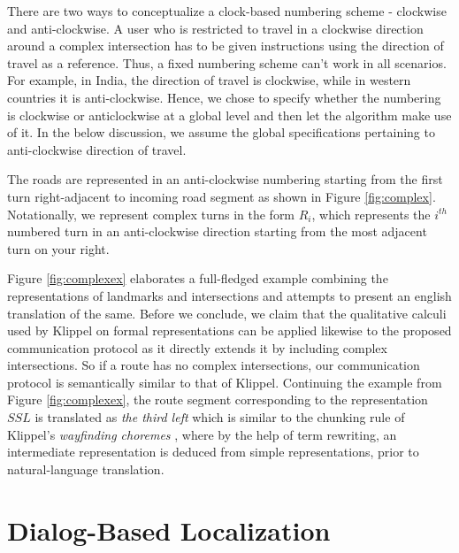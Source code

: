 \documentclass{iitkthesis}
\begin{document}
There are two ways to conceptualize a clock-based numbering scheme - clockwise and anti-clockwise. A user who is restricted to travel in a clockwise direction around a complex intersection has to be given instructions using the direction of travel as a reference. Thus, a fixed numbering scheme can't work in all scenarios. For example, in India, the direction of travel is clockwise, while in western countries it is anti-clockwise. Hence, we chose to specify whether the numbering is clockwise or anticlockwise at a global level and then let the algorithm make use of it. In the below discussion, we assume the global specifications pertaining to anti-clockwise direction of travel.

The roads are represented in an anti-clockwise numbering starting from the first turn right-adjacent to 
incoming road segment as shown in Figure \ref{fig:complex}. Notationally, 
we represent complex turns in the form $R_i$, which represents the 
$i^{th}$ numbered turn in an anti-clockwise direction starting from the most 
adjacent turn on your right.

Figure \ref{fig:complexex} elaborates a full-fledged example combining 
the representations of landmarks and intersections and attempts to 
present an english translation of the same. Before we conclude, we claim 
that the qualitative calculi used by Klippel \cite{klippel} on formal 
representations can be applied likewise to the proposed communication 
protocol as it directly extends it by including 
complex intersections. So if a route has no complex intersections, our 
communication protocol is semantically similar to that of Klippel. 
Continuing the example from Figure \ref{fig:complexex}, the route 
segment corresponding to the representation $SSL$ is translated as 
\textit{the third left} which is similar to the chunking rule of 
Klippel's \textit{wayfinding choremes} \cite{klippel}, where by the help 
of term rewriting, an intermediate representation is deduced from simple 
representations, prior to natural-language translation.

 \chapter{Dialog-Based Localization}
\end{document}
